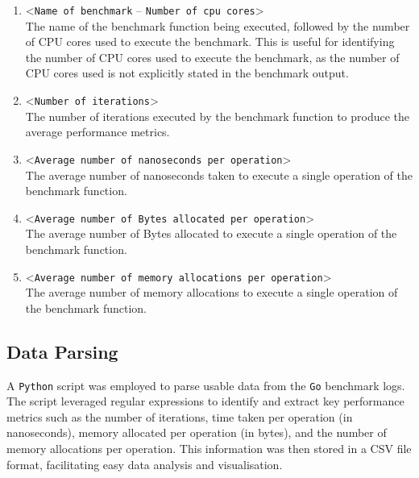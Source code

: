 \begin{enumerate}
    \item \textless\lstinline{Name of benchmark} -- \lstinline{Number of cpu cores}\textgreater\\The name of the benchmark function being executed, followed by the number of CPU cores used to execute the benchmark. This is useful for identifying the number of CPU cores used to execute the benchmark, as the number of CPU cores used is not explicitly stated in the benchmark output.
    \item \textless\lstinline{Number of iterations}\textgreater\\The number of iterations executed by the benchmark function to produce the average performance metrics.
    \item \textless\lstinline{Average number of nanoseconds per operation}\textgreater\\The average number of nanoseconds taken to execute a single operation of the benchmark function.
    \item \textless\lstinline{Average number of Bytes allocated per operation}\textgreater\\The average number of Bytes allocated to execute a single operation of the benchmark function.
    \item \textless\lstinline{Average number of memory allocations per operation}\textgreater\\The average number of memory allocations to execute a single operation of the benchmark function.
\end{enumerate}

\subsection*{Data Parsing}
A \lstinline{Python} script was employed to parse usable data from the \lstinline{Go} benchmark logs. The script leveraged regular expressions to identify and extract key performance metrics such as the number of iterations, time taken per operation (in nanoseconds), memory allocated per operation (in bytes), and the number of memory allocations per operation. This information was then stored in a CSV file format, facilitating easy data analysis and visualisation.

